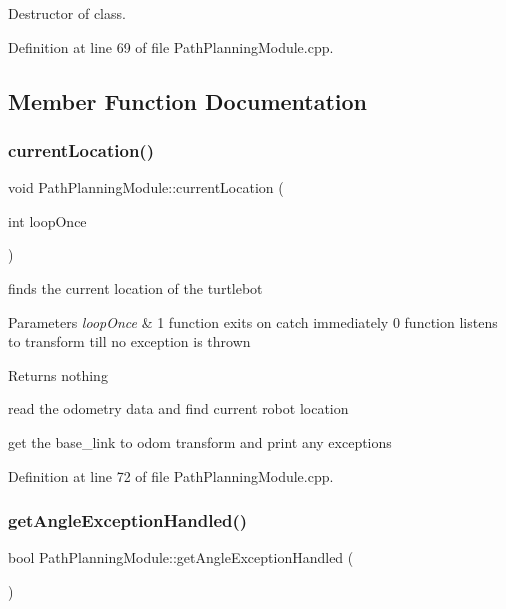 Destructor of class. 



Definition at line 69 of file Path\+Planning\+Module.\+cpp.



\subsection{Member Function Documentation}
\mbox{\label{class_path_planning_module_a49c334a5359a2ba96d483c86bbcca1b4}} 
\subsubsection{\texorpdfstring{current\+Location()}{currentLocation()}}
{\footnotesize\ttfamily void Path\+Planning\+Module\+::current\+Location (\begin{DoxyParamCaption}\item[{int}]{loop\+Once }\end{DoxyParamCaption})}



finds the current location of the turtlebot 


\begin{DoxyParams}{Parameters}
{\em loop\+Once} & 1 function exits on catch immediately 0 function listens to transform till no exception is thrown \\
\hline
\end{DoxyParams}
\begin{DoxyReturn}{Returns}
nothing 
\end{DoxyReturn}
read the odometry data and find current robot location

get the base\+\_\+link to odom transform and print any exceptions 

Definition at line 72 of file Path\+Planning\+Module.\+cpp.

\mbox{\label{class_path_planning_module_a0772b25a199dd9bbec6452606fdd8722}} 
\subsubsection{\texorpdfstring{get\+Angle\+Exception\+Handled()}{getAngleExceptionHandled()}}
{\footnotesize\ttfamily bool Path\+Planning\+Module\+::get\+Angle\+Exception\+Handled (\begin{DoxyParamCaption}{ }\end{DoxyParamCaption})}



